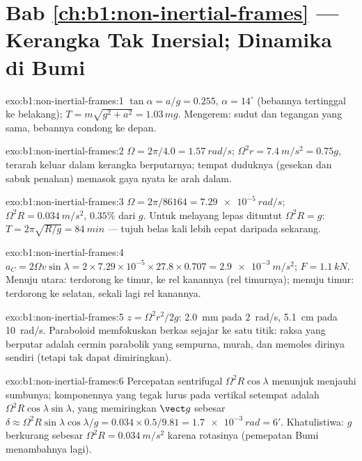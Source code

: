 \section*{Bab \ref{ch:b1:non-inertial-frames} --- Kerangka Tak Inersial; Dinamika di Bumi}

\begin{solution}{exo:b1:non-inertial-frames:1}
$\tan\alpha = a/g = 0.255$, $\alpha = 14^\circ$ (bebannya tertinggal ke belakang);
$T = m\sqrt{g^2 + a^2} = 1.03\,mg$. Mengerem: sudut dan tegangan yang sama,
bebannya condong ke depan.
\end{solution}

\begin{solution}{exo:b1:non-inertial-frames:2}
$\Omega = 2\pi/4.0 = \qty{1.57}{rad/s}$; $\Omega^2r = \qty{7.4}{m/s^2} = 0.75g$,
terarah keluar dalam kerangka berputarnya; tempat duduknya (gesekan dan
sabuk penahan) memasok gaya nyata ke arah dalam.
\end{solution}

\begin{solution}{exo:b1:non-inertial-frames:3}
$\Omega = 2\pi/86164 = \qty{7.29e-5}{rad/s}$; $\Omega^2R = \qty{0.034}{m/s^2}$,
$0.35\%$ dari $g$. Untuk melayang lepas dituntut $\Omega^2R = g$: $T = 2\pi\sqrt{R/g} =
\qty{84}{min}$ --- tujuh belas kali lebih cepat daripada sekarang.
\end{solution}

\begin{solution}{exo:b1:non-inertial-frames:4}
$a_C = 2\Omega v\sin\lambda = 2 \times 7.29\times10^{-5} \times 27.8 \times 0.707
= \qty{2.9e-3}{m/s^2}$; $F = \qty{1.1}{kN}$. Menuju utara: terdorong ke timur,
ke rel kanannya (rel timurnya); menuju timur: terdorong ke selatan, sekali lagi
rel kanannya.
\end{solution}

\begin{solution}{exo:b1:non-inertial-frames:5}
$z = \Omega^2r^2/2g$: \qty{2.0}{mm} pada \qty{2}{rad/s}, \qty{5.1}{cm} pada
\qty{10}{rad/s}. Paraboloid memfokuskan berkas sejajar ke satu titik:
raksa yang berputar adalah cermin parabolik yang sempurna, murah, dan memoles
dirinya sendiri (tetapi tak dapat dimiringkan).
\end{solution}

\begin{solution}{exo:b1:non-inertial-frames:6}
Percepatan sentrifugal $\Omega^2R\cos\lambda$ menunjuk menjauhi
sumbunya; komponennya yang tegak lurus pada vertikal setempat adalah $\Omega^2R\cos\lambda
\sin\lambda$, yang memiringkan $\vect g$ sebesar $\delta \approx \Omega^2R\sin\lambda\cos\lambda/g
= 0.034 \times 0.5/9.81 = \qty{1.7e-3}{rad} = 6'$. Khatulistiwa: $g$ berkurang sebesar
$\Omega^2R = \qty{0.034}{m/s^2}$ karena rotasinya (pemepatan Bumi menambahnya lagi).
\end{solution}

